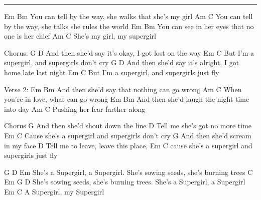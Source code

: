 \noindent\rule{\columnwidth}{1pt}
\begin{lstsong}
                    Em                           Bm
You can tell by the way, she walks that she's my girl
                    Am                           C
You can tell by the way, she talks she rules the world
                   Em                      Bm
You can see in her eyes that no one is her chief
         Am            C
She's my girl, my supergirl

Chorus:
               G                    D
And then she'd say it's okay, I got lost on the way
               Em                         C
But I'm a supergirl, and supergirls don't cry
               G                       D
And then she'd say it's alright, I got home late last night
               Em                        C
But I'm a supergirl, and supergirls just fly

Verse 2:
                    Em              Bm
And then she'd say that nothing can go wrong
                    Am             C
When you're in love, what can go wrong
                    Em                  Bm
And then she'd laugh the night time into day
         Am             C
Pushing her fear farther along

Chorus
               G
And then she'd shout down the line
                D
Tell me she's got no more time
               Em                           C
Cause she's a supergirl and supergirls don't cry
                G
And then she'd scream in my face
           D
Tell me to leave, leave this place,
                   Em                       C
cause she's a supergirl and supergirls just fly

             G            D                   Em
She's a Supergirl, a Supergirl. She's sowing seeds, she's burning trees
              C                   Em                  G            D
She's sowing seeds, she's burning trees. She's a Supergirl, a Supergirl
     Em           C
A Supergirl, my Supergirl
\end{lstsong}
\newpage


